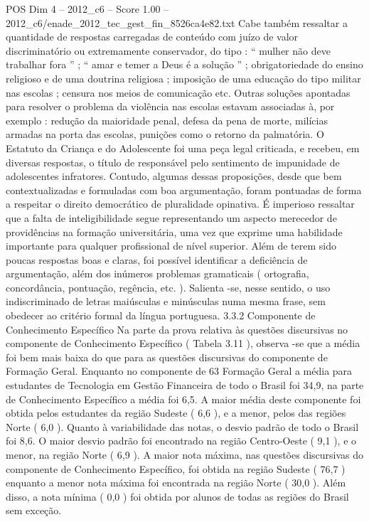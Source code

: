 \begin{textsample}{POS Dim 4 – 2012\_c6 – Score 1.00 – 2012\_c6/enade\_2012\_tec\_gest\_fin\_8526ca4e82.txt}
Cabe também ressaltar a quantidade de respostas carregadas de conteúdo com juízo de valor discriminatório ou extremamente conservador, do tipo : “ mulher não deve trabalhar fora ” ; “ amar e temer a Deus é a solução ” ; obrigatoriedade do ensino religioso e de uma doutrina religiosa ; imposição de uma educação do tipo militar nas escolas ; censura nos meios de comunicação etc.
Outras soluções apontadas para resolver o problema da violência nas escolas estavam associadas à, por exemplo : redução da maioridade penal, defesa da pena de morte, milícias armadas na porta das escolas, punições como o retorno da palmatória.
O Estatuto da Criança e do Adolescente foi uma peça legal criticada, e recebeu, em diversas respostas, o título de responsável pelo sentimento de impunidade de adolescentes infratores.
Contudo, algumas dessas proposições, desde que bem contextualizadas e formuladas com boa argumentação, foram pontuadas de forma a respeitar o direito democrático de pluralidade opinativa.
É imperioso ressaltar que a falta de inteligibilidade segue representando um aspecto merecedor de providências na formação universitária, uma vez que exprime uma habilidade importante para qualquer profissional de nível superior.
Além de terem sido poucas respostas boas e claras, foi possível identificar a deficiência de argumentação, além dos inúmeros problemas gramaticais ( ortografia, concordância, pontuação, regência, etc. ).
Salienta -se, nesse sentido, o uso indiscriminado de letras maiúsculas e minúsculas numa mesma frase, sem obedecer ao critério formal da língua portuguesa. 3.3.2 Componente de Conhecimento Específico Na parte da prova relativa às questões discursivas no componente de Conhecimento Específico ( Tabela 3.11 ), observa -se que a média foi bem mais baixa do que para as questões discursivas do componente de Formação Geral.
Enquanto no componente de 63 Formação Geral a média para estudantes de Tecnologia em Gestão Financeira de todo o Brasil foi 34,9, na parte de Conhecimento Específico a média foi 6,5.
A maior média deste componente foi obtida pelos estudantes da região Sudeste ( 6,6 ), e a menor, pelos das regiões Norte ( 6,0 ).
Quanto à variabilidade das notas, o desvio padrão de todo o Brasil foi 8,6.
O maior desvio padrão foi encontrado na região Centro-Oeste ( 9,1 ), e o menor, na região Norte ( 6,9 ).
A maior nota máxima, nas questões discursivas do componente de Conhecimento Específico, foi obtida na região Sudeste ( 76,7 ) enquanto a menor nota máxima foi encontrada na região Norte ( 30,0 ).
Além disso, a nota mínima ( 0,0 ) foi obtida por alunos de todas as regiões do Brasil sem exceção.

\end{textsample}
